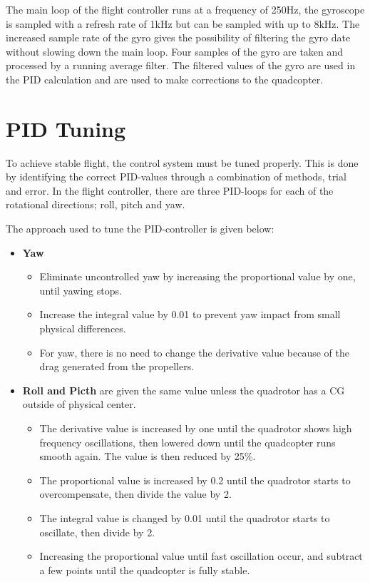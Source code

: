 The main loop of the flight controller runs at a frequency of 250Hz, the gyroscope is sampled with a refresh rate of 1kHz but can be sampled with up to 8kHz. 
The increased sample rate of the gyro gives the possibility of filtering the gyro date without slowing down the main loop. Four samples of the gyro are taken and processed by a running average filter. The filtered values of the gyro are used in the PID calculation and are used to make corrections to the quadcopter. \\ 
\section{PID Tuning}
To achieve stable flight, the control system must be tuned properly. This is done by identifying the correct PID-values through a combination of methods, trial and error. In the flight controller, there are three PID-loops for each of the rotational directions; roll, pitch and yaw. \bigskip

The approach used to tune the PID-controller is given below:
\begin{itemize}
    \item \textbf{Yaw}
        \begin{itemize}
            \item  Eliminate uncontrolled yaw by increasing the proportional value by one, until yawing stops.
            \item  Increase the integral value by 0.01 to prevent yaw impact from small physical differences. 
            \item  For yaw, there is no need to change the derivative value because of the drag generated from the propellers.
        \end{itemize}
    \item \textbf{Roll and Picth} are given the same value unless the quadrotor has a CG outside of physical center.
        \begin{itemize}
            \item The derivative value is increased by one until the quadrotor shows high frequency oscillations, then lowered down until the quadcopter runs smooth again. The value is then reduced by 25\%. 
            \item The proportional value is increased by 0.2 until the quadrotor starts to overcompensate, then divide the value by 2.
            \item The integral value is changed by 0.01 until the quadrotor starts to oscillate, then divide by 2.
            \item Increasing the proportional value until fast oscillation occur, and subtract a few points until the quadcopter is fully stable. 
        \end{itemize}
\end{itemize}

